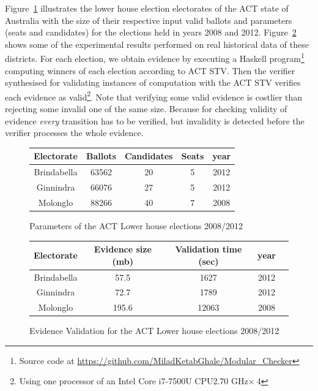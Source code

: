 \documentclass[10pt,conference]{IEEEtran}
\begin{document}
Figure~\ref{ParamACT} illustrates the lower house election electorates of the ACT state of Australia with the size of their respective input valid ballots and parameters (seats and candidates) for the elections held in years 2008 and 2012. Figure~\ref{EvACT} shows some of the experimental results performed on real historical data of these districts. For each election, we obtain evidence  by executing a Haskell program\footnote{Source code at \url{https://github.com/MiladKetabGhale/Modular_Checker}} computing winners of each election  according to ACT STV. Then the verifier synthesised for validating instances of computation with the ACT STV verifies each evidence as valid\footnote{Using one processor of an Intel Core i7-7500U CPU\@ 2.70 GHz$\times~$4}. Note that verifying    some valid evidence is costlier than rejecting some invalid one of the same size. Because for checking validity of evidence \emph{every}  transition has to be verified, but invalidity is detected before the verifier processes the whole evidence. 
\begin{figure}[t]
\centering
\begin{small}
\begin{tabular}{|c | c | c | c | c|}
\hline
Electorate&Ballots&Candidates&Seats&year\\
\hline
Brindabella&63562&20&5&2012\\
\hline
Ginnindra&66076&27&5&2012\\
\hline
Molonglo&88266&40&7&2008\\
\hline
\end{tabular}
\end{small} 
\caption{Parameters of the ACT Lower house elections 2008/2012} 
\label{ParamACT}
\end{figure}
\begin{figure}[h]
\centering
\begin{small}
\begin{tabular}{|c | c | c | c | c|}
\hline
Electorate&Evidence size (mb)&Validation time (sec)&year\\
\hline
Brindabella&57.5&1627&2012\\
\hline
Ginnindra&72.7&1789&2012\\
\hline
Molonglo&195.6&12063&2008\\
\hline
\end{tabular}
\end{small} 
\caption{Evidence Validation for the ACT Lower house elections 2008/2012}
\label{EvACT} 
\end{figure}
\end{document}
